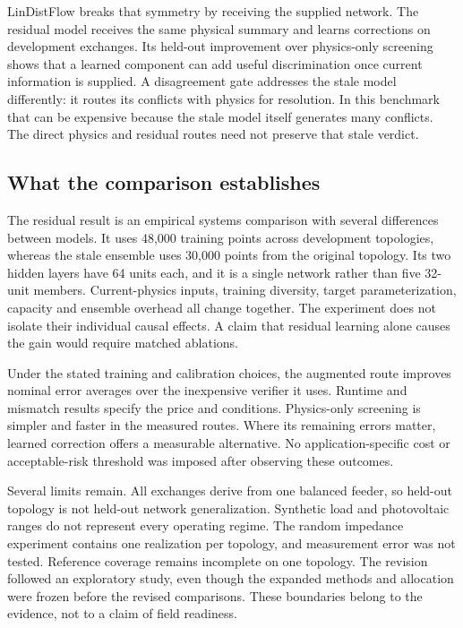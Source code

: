 LinDistFlow breaks that symmetry by receiving the supplied network. The residual model receives the same physical summary and learns corrections on development exchanges. Its held-out improvement over physics-only screening shows that a learned component can add useful discrimination once current information is supplied. A disagreement gate addresses the stale model differently: it routes its conflicts with physics for resolution. In this benchmark that can be expensive because the stale model itself generates many conflicts. The direct physics and residual routes need not preserve that stale verdict.

\subsection{What the comparison establishes}

The residual result is an empirical systems comparison with several differences between models. It uses 48,000 training points across development topologies, whereas the stale ensemble uses 30,000 points from the original topology. Its two hidden layers have 64 units each, and it is a single network rather than five 32-unit members. Current-physics inputs, training diversity, target parameterization, capacity and ensemble overhead all change together. The experiment does not isolate their individual causal effects. A claim that residual learning alone causes the gain would require matched ablations.

Under the stated training and calibration choices, the augmented route improves nominal error averages over the inexpensive verifier it uses. Runtime and mismatch results specify the price and conditions. Physics-only screening is simpler and faster in the measured routes. Where its remaining errors matter, learned correction offers a measurable alternative. No application-specific cost or acceptable-risk threshold was imposed after observing these outcomes.

Several limits remain. All exchanges derive from one balanced feeder, so held-out topology is not held-out network generalization. Synthetic load and photovoltaic ranges do not represent every operating regime. The random impedance experiment contains one realization per topology, and measurement error was not tested. Reference coverage remains incomplete on one topology. The revision followed an exploratory study, even though the expanded methods and allocation were frozen before the revised comparisons. These boundaries belong to the evidence, not to a claim of field readiness.

